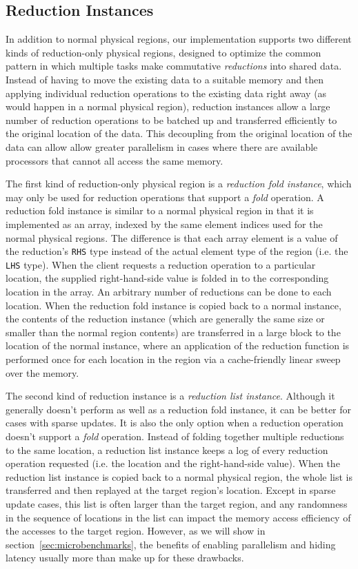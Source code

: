 \subsection{Reduction Instances}
\label{subsec:reducimpl}

In addition to normal physical regions, our implementation supports two different kinds of reduction-only
physical regions, designed to optimize the common pattern in which multiple tasks make commutative 
{\em reductions} into shared data.  Instead of having to move the existing data to a suitable memory and
then applying individual reduction operations to the existing data 
right away (as would happen in a normal physical region), reduction instances allow a large number of
reduction operations to be batched up and transferred efficiently to the original location of the data.
This decoupling from the original location of the data can allow allow greater parallelism
in cases where there are available processors that cannot all access the same memory.

The first kind of reduction-only physical region is a {\em reduction fold instance}, which may only be
used for reduction operations that support a {\em fold} operation.  A reduction fold instance is similar
to a normal physical region in that it is implemented as an array, indexed by the same element indices used
for the normal physical regions.  The difference is that each array element is a value of the reduction's
{\tt RHS} type instead of the actual element type of the region (i.e. the {\tt LHS} type).  When the client
requests a reduction operation to a particular location, the supplied right-hand-side value is folded in
to the corresponding location in the array.  An arbitrary number of reductions can be done to each location.
When the reduction fold instance is copied back to a normal instance, the contents of the reduction instance
(which are generally the same size or smaller than the normal region contents) are transferred in a large
block to the location of the normal instance, where an application of the reduction function is performed
once for each location in the region via a cache-friendly linear sweep over the memory.

The second kind of reduction instance is a {\em reduction list instance}.  Although it generally doesn't
perform as well as a reduction fold instance, it can be better for cases with sparse updates.  It is also
the only option when a reduction operation doesn't support a {\em fold} operation.  Instead of folding
together multiple reductions to the same location, a reduction list instance keeps a log of every
reduction operation requested (i.e. the location and the right-hand-side value).  When the reduction list 
instance is copied back to a normal physical region, the whole list is transferred and then replayed at
the target region's location.  Except in sparse update cases, this list is often larger than the target
region, and any randomness in the sequence of locations in the list can impact the memory access efficiency
of the accesses to the target region.  However, as we will show in section~\ref{sec:microbenchmarks}, 
the benefits of enabling parallelism and hiding latency usually more than make up for these drawbacks.
